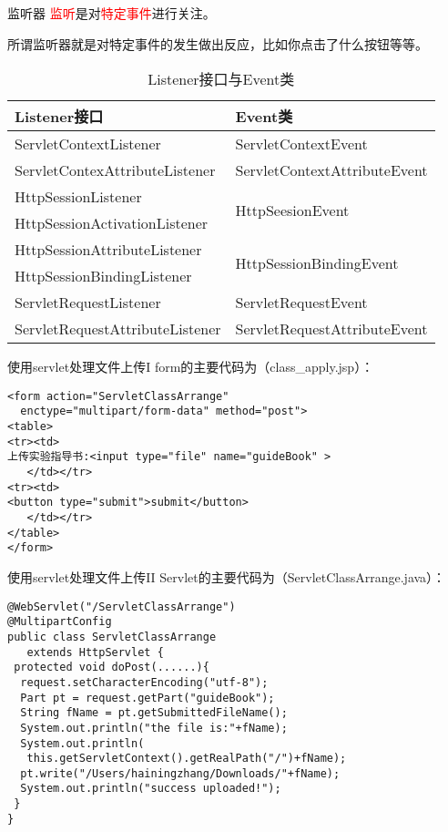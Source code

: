 \documentclass{beamer}
\begin{document}
\begin{frame}{监听器}
\textcolor{red}{监听}是对\textcolor{red}{特定事件}进行关注。

所谓监听器就是对特定事件的发生做出反应，比如你点击了什么按钮等等。
\begin{table}
\begin{tabular}{ll}
\toprule
\textbf{Listener接口}&\textbf{Event类}\\
\midrule
ServletContextListener&ServletContextEvent\\
ServletContexAttributeListener&ServletContextAttributeEvent\\
HttpSessionListener&\multirow{2}{*}{HttpSeesionEvent}\\
HttpSessionActivationListener&\\
HttpSessionAttributeListener&\multirow{2}{*}{HttpSessionBindingEvent}\\
HttpSessionBindingListener&\\
ServletRequestListener&ServletRequestEvent\\
ServletRequestAttributeListener&ServletRequestAttributeEvent\\
\bottomrule
\end{tabular}
\caption{Listener接口与Event类}
\end{table}
\end{frame}


\begin{frame}[fragile]{使用servlet处理文件上传I}
form的主要代码为（class\_apply.jsp）：
\begin{lstlisting}
<form action="ServletClassArrange" 
  enctype="multipart/form-data" method="post">
<table>
<tr><td>
上传实验指导书:<input type="file" name="guideBook" >
   </td></tr>
<tr><td>
<button type="submit">submit</button>
   </td></tr>
</table>
</form>
\end{lstlisting}
\end{frame}
\begin{frame}[fragile]{使用servlet处理文件上传II}
Servlet的主要代码为（ServletClassArrange.java）：
\begin{lstlisting}
@WebServlet("/ServletClassArrange")
@MultipartConfig
public class ServletClassArrange 
   extends HttpServlet {
 protected void doPost(......){
  request.setCharacterEncoding("utf-8");
  Part pt = request.getPart("guideBook");
  String fName = pt.getSubmittedFileName();
  System.out.println("the file is:"+fName);
  System.out.println(
   this.getServletContext().getRealPath("/")+fName);
  pt.write("/Users/hainingzhang/Downloads/"+fName);
  System.out.println("success uploaded!");
 }
}
\end{lstlisting}
\end{frame}
\end{document}
